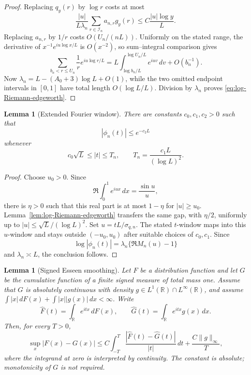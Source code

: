 \documentclass[11pt]{article}
\newtheorem{lemma}[theorem]{Lemma}
\theoremstyle{remark}
\newcommand{\dd}{\,d}
\begin{document}
\begin{proof}
Replacing $q_y(r)$ by $\log r$ costs at most
\[
 \frac{|u|}{L\lambda_n}\sum_{r\in\mathcal I_n}a_{n,r}g_y(r)
 \le C\frac{|u|\log y}{L}.
\]
Replacing $a_{n,r}$ by $1/r$ costs $O(U_n/(nL))$.  Uniformly on the stated
range, the derivative of
$x^{-1}e^{iu\log x/L}$ is $O(x^{-2})$, so sum--integral comparison gives
\[
 \sum_{b_n<r\le U_n}\frac1r e^{iu\log r/L}
 =L\int_{\log b_n/L}^{\log U_n/L}e^{iuv}\dd v+O(b_n^{-1}).
\]
Now
$\lambda_n=L-(A_0+3)\log L+O(1)$, while the two omitted endpoint intervals
in $[0,1]$ have total length $O(\log L/L)$.  Division by $\lambda_n$ proves
\eqref{eq:log-Riemann-edgeworth}.
\end{proof}

\begin{lemma}[Extended Fourier window]
\label{lem:extended-window}
There are constants $c_0,c_1,c_2>0$ such that
\[
 |\phi_n(t)|\le e^{-c_2L}
\]
whenever
\[
 c_0\sqrt L\le|t|\le T_n,
 \qquad
 T_n=\frac{c_1L}{(\log L)^2}.
\]
\end{lemma}

\begin{proof}
Choose $u_0>0$.  Since
\[
 \Re\int_0^1e^{iux}\dd x=\frac{\sin u}{u},
\]
there is $\eta>0$ such that this real part is at most $1-\eta$ for
$|u|\ge u_0$.  Lemma~\ref{lem:log-Riemann-edgeworth} transfers the same gap,
with $\eta/2$, uniformly up to $|u|\le\sqrt L/(\log L)^2$.
Set $u=tL/\sigma_{q,n}$.  The stated $t$-window maps into this $u$-window
and stays outside $(-u_0,u_0)$ after suitable choices of $c_0,c_1$.  Since
\[
 \log|\phi_n(t)|=\lambda_n\{\Re M_n(u)-1\}
\]
and $\lambda_n\asymp L$, the conclusion follows.
\end{proof}

\begin{lemma}[Signed Esseen smoothing]
\label{lem:signed-Esseen}
Let $F$ be a distribution function and let $G$ be the cumulative function
of a finite signed measure of total mass one.  Assume that $G$ is absolutely
continuous with density $g\in L^1(\mathbb R)\cap L^\infty(\mathbb R)$,
and assume
$\int |x|\dd F(x)+\int |x||g(x)|\dd x<\infty$.  Write
\[
 \widehat F(t)=\int_{\mathbb R}e^{itx}\dd F(x),
 \qquad
 \widehat G(t)=\int_{\mathbb R}e^{itx}g(x)\dd x.
\]
Then, for every $T>0$,
\begin{equation}
\label{eq:signed-Esseen}
 \sup_x|F(x)-G(x)|
 \le C\int_{-T}^{T}
 \frac{|\widehat F(t)-\widehat G(t)|}{|t|}\dd t
 +\frac{C\|g\|_\infty}{T},
\end{equation}
where the integrand at zero is interpreted by continuity.  The constant is
absolute; monotonicity of $G$ is not required.
\end{lemma}
\end{document}
